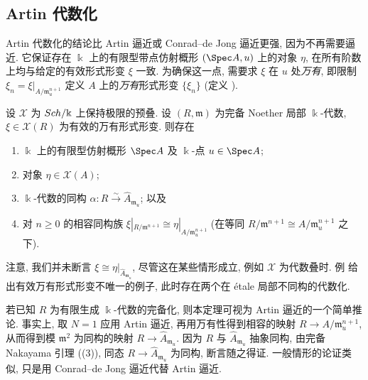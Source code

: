 \subsection{Artin 代数化}\label{src:C.6.3-subsection}
Artin 代数化的结论比 Artin 逼近或 Conrad--de Jong 逼近更强, 因为不再需要逼近. 它保证存在 $\Bbbk$ 上的有限型带点仿射概形 $(\Spec A,u)$ 上的对象 $\eta$, 在所有阶数上均与给定的有效形式形变 $\xi$ 一致. 为确保这一点, 需要求 $\xi$ 在 $u$ 处\textit{万有}, 即限制 $\xi_n=\xi|_{A/\mathfrak m_u^{n+1}}$ 定义 $A$ 上的\textit{万有}形式形变 $\{\xi_n\}$ (定义 ).
\begin{theorem}\label{src:C.6.8}
设 $\mathcal X$ 为 $Sch/\Bbbk$ 上保持极限的预叠. 设 $(R,\mathfrak m)$ 为完备 Noether 局部 $\Bbbk$-代数, $\xi\in\mathcal X(R)$ 为有效的万有形式形变. 则存在
\begin{enumerate}[(1)]
\item $\Bbbk$ 上的有限型仿射概形 $\Spec A$ 及 $\Bbbk$-点 $u\in\Spec A$;
\item 对象 $\eta\in\mathcal X(A)$;
\item $\Bbbk$-代数的同构 $\alpha:R\xrightarrow\sim\widehat A_{\mathfrak m_u}$; 以及
\item 对 $n\geq0$ 的相容同构族 $\xi|_{R/\mathfrak m^{n+1}}\cong\eta|_{A/\mathfrak m_u^{n+1}}$ (在等同 $R/\mathfrak m^{n+1}\cong A/\mathfrak m_u^{n+1}$ 之下).
\end{enumerate}
\end{theorem}
注意, 我们并未断言 $\xi\cong\eta|_{\widehat A_{\mathfrak m_u}}$, 尽管这在某些情形成立, 例如 $\mathcal X$ 为代数叠时. 例  给出有效万有形式形变不唯一的例子, 此时存在两个在 étale 局部不同构的代数化.
\begin{remark}\label{src:C.6.9}
若已知 $R$ 为有限生成 $\Bbbk$-代数的完备化, 则本定理可视为 Artin 逼近的一个简单推论. 事实上, 取 $N=1$ 应用 Artin 逼近, 再用万有性得到相容的映射 $R\to A/\mathfrak m_u^{n+1}$, 从而得到模 $\mathfrak m^2$ 为同构的映射 $R\to\widehat A_{\mathfrak m_u}$. 因为 $R$ 与 $\widehat A_{\mathfrak m_u}$ 抽象同构, 由完备 Nakayama 引理 ((3)), 同态 $R\to\widehat A_{\mathfrak m_u}$ 为同构, 断言随之得证. 一般情形的论证类似, 只是用 Conrad--de Jong 逼近代替 Artin 逼近.
\end{remark}
